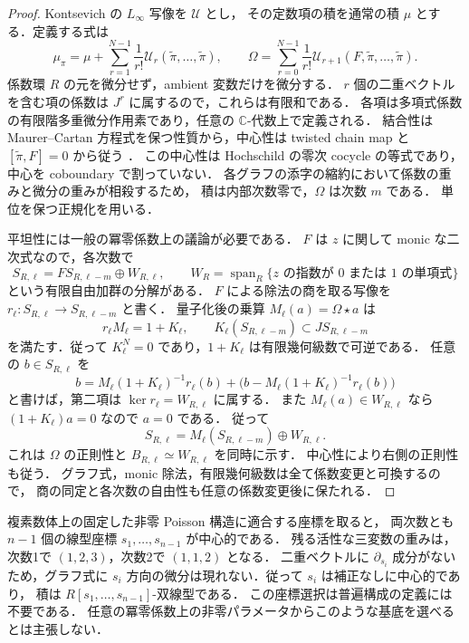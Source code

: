 \begin{proof}
Kontsevich の $L_\infty$ 写像を $\mathcal U$ とし，
その定数項の積を通常の積 $\mu$ とする．定義する式は
\[
 \mu_\pi=\mu+\sum_{r=1}^{N-1}\frac1{r!}
       \mathcal U_r(\widetilde\pi,\ldots,\widetilde\pi),
 \qquad
 \Omega=\sum_{r=0}^{N-1}\frac1{r!}
       \mathcal U_{r+1}(F,\widetilde\pi,\ldots,\widetilde\pi).
\]
係数環 $R$ の元を微分せず，ambient 変数だけを微分する．
$r$ 個の二重ベクトルを含む項の係数は $J^r$ に属するので，これらは有限和である．
各項は多項式係数の有限階多重微分作用素であり，任意の $\mathbb C$-代数上で定義される．
結合性は Maurer--Cartan 方程式を保つ性質から，中心性は twisted chain map と
$[\widetilde\pi,F]=0$ から従う
\cite[\S4.6.2，\S6，\S8]{Kontsevich}．
この中心性は Hochschild の零次 cocycle の等式であり，中心を coboundary で割っていない．
各グラフの添字の縮約において係数の重みと微分の重みが相殺するため，
積は内部次数零で，$\Omega$ は次数 $m$ である．
単位を保つ正規化を用いる．

平坦性には一般の冪零係数上の議論が必要である．
$F$ は $z$ に関して monic な二次式なので，各次数で
\[
 S_{R,\ell}=F S_{R,\ell-m}\oplus W_{R,\ell},
 \qquad
 W_R=\operatorname{span}_R\{\text{$z$ の指数が $0$ または $1$ の単項式}\}
\]
という有限自由加群の分解がある．
$F$ による除法の商を取る写像を
$r_\ell:S_{R,\ell}\to S_{R,\ell-m}$ と書く．
量子化後の乗算 $M_\ell(a)=\Omega\star a$ は
\[
 r_\ell M_\ell=1+K_\ell,
 \qquad K_\ell(S_{R,\ell-m})\subset J S_{R,\ell-m}
\]
を満たす．従って $K_\ell^N=0$ であり，$1+K_\ell$ は有限幾何級数で可逆である．
任意の $b\in S_{R,\ell}$ を
\[
 b=M_\ell(1+K_\ell)^{-1}r_\ell(b)
   +\bigl(b-M_\ell(1+K_\ell)^{-1}r_\ell(b)\bigr)
\]
と書けば，第二項は $\ker r_\ell=W_{R,\ell}$ に属する．
また $M_\ell(a)\in W_{R,\ell}$ なら $(1+K_\ell)a=0$ なので $a=0$ である．
従って
\[
 S_{R,\ell}=M_\ell(S_{R,\ell-m})\oplus W_{R,\ell}.
\]
これは $\Omega$ の正則性と $B_{R,\ell}\simeq W_{R,\ell}$ を同時に示す．
中心性により右側の正則性も従う．
グラフ式，monic 除法，有限幾何級数は全て係数変更と可換するので，
商の同定と各次数の自由性も任意の係数変更後に保たれる．
\end{proof}

\begin{remark}[中心的な線型座標]
複素数体上の固定した非零 Poisson 構造に適合する座標を取ると，
両次数とも $n-1$ 個の線型座標 $s_1,\ldots,s_{n-1}$ が中心的である．
残る活性な三変数の重みは，次数1で $(1,2,3)$，次数2で $(1,1,2)$ となる．
二重ベクトルに $\partial_{s_i}$ 成分がないため，グラフ式に
$s_i$ 方向の微分は現れない．従って $s_i$ は補正なしに中心的であり，
積は $R[s_1,\ldots,s_{n-1}]$-双線型である．
この座標選択は普遍構成の定義には不要である．
任意の冪零係数上の非零パラメータからこのような基底を選べるとは主張しない．
\end{remark}

